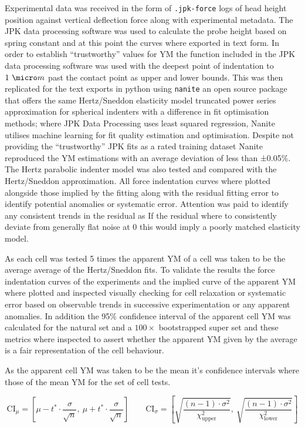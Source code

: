 \documentclass[
  paper=a4,
  ,captions=tableheading
]{scrartcl}
\begin{document}
Experimental data was received in the form of \texttt{.jpk-force} logs
of head height position against vertical deflection force along with
experimental metadata. The JPK data processing software was used to
calculate the probe height based on spring constant and at this point
the curves where exported in text form. In order to establish
``trustworthy'' values for YM the function included in the JPK data
processing software was used with the deepest point of indentation to
\(1 \ \micro m\) past the contact point as upper and lower bounds. This
was then replicated for the text exports in python using \texttt{nanite}
an open source package that offers the same Hertz/Sneddon elasticity
model truncated power series approximation for spherical indenters with
a difference in fit optimisation methods; where JPK Data Processing uses
least squared regression, Nanite utilises machine learning for fit
quality estimation and optimisation. Despite not providing the
``trustworthy'' JPK fits as a rated training dataset Nanite reproduced
the YM estimations with an average deviation of less than ±0.05\%. The
Hertz parabolic indenter model was also tested and compared with the
Hertz/Sneddon approximation. All force indentation curves where plotted
alongside those implied by the fitting along with the residual fitting
error to identify potential anomalies or systematic error. Attention was
paid to identify any consistent trends in the residual as If the
residual where to consistently deviate from generally flat noise at 0
this would imply a poorly matched elasticity model.

As each cell was tested 5 times the apparent YM of a cell was taken to
be the average average of the Hertz/Sneddon fits. To validate the
results the force indentation curves of the experiments and the implied
curve of the apparent YM where plotted and inspected visually checking
for cell relaxation or systematic error based on observable trends in
successive experimentation or any apparent anomalies. In addition the
95\% confidence interval of the apparent cell YM was calculated for the
natural set and a \(100 \times\) bootstrapped super set and these
metrics where inspected to assert whether the apparent YM given by the
average is a fair representation of the cell behaviour.

As the apparent cell YM was taken to be the mean it's confidence
intervals where those of the mean YM for the set of cell tests.

\[\text{CI}_\mu = \left[ \mu - t^* \cdot \frac{\sigma}{\sqrt{n}},\ \mu + t^* \cdot \frac{\sigma}{\sqrt{n}} \right]
\qquad
\text{CI}_\sigma = \left[ \sqrt{ \frac{(n-1) \cdot \sigma^2}{\chi^2_{\text{upper}}} },\ \sqrt{ \frac{(n-1) \cdot \sigma^2}{\chi^2_{\text{lower}}} } \right]
\]
\end{document}

